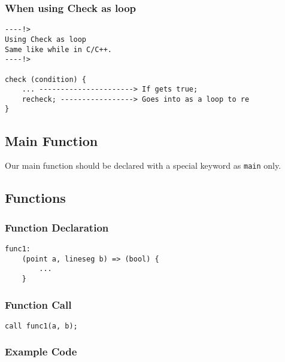 \documentclass{article}
\begin{document}
\subsubsection{When using Check as loop}
\begin{verbatim}
----!>
Using Check as loop
Same like while in C/C++.
----!>

check (condition) {
    ... ----------------------> If gets true;
    recheck; -----------------> Goes into as a loop to re
}
\end{verbatim}

\subsection{Main Function}
Our main function should be declared with a special keyword as \texttt{main} only.

\subsection{Functions}
\subsubsection{Function Declaration}
\begin{verbatim}
func1:
    (point a, lineseg b) => (bool) {
        ...
    }
\end{verbatim}

\subsubsection{Function Call}
\begin{verbatim}
call func1(a, b);
\end{verbatim}

\subsubsection{Example Code}
\end{document}
